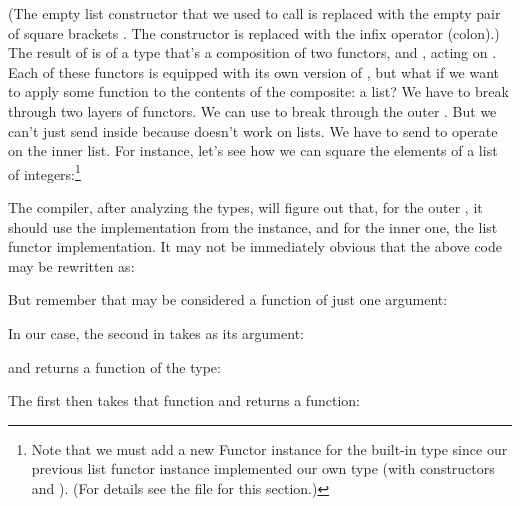 (The empty list constructor that we used to call  is
replaced with the empty pair of square brackets \code{{[}{]}}. The
 constructor is replaced with the infix operator \code{:}
(colon).) The result of  is of a type that's a
composition of two functors,  and \code{{[}{]}}, acting
on . Each of these functors is equipped with its own version
of , but what if we want to apply some function 
to the contents of the composite: a  list? We have to
break through two layers of functors. We can use  to break
through the outer . But we can't just send 
inside  because  doesn't work on lists. We have
to send  to operate on the inner list. For instance,
let's see how we can square the elements of a  list of
integers:\footnote{Note that we must add a new Functor instance
for the built-in  type since our previous list functor
instance implemented our own  type (with constructors
 and ). (For details see the 
file for this section.)}

The compiler, after analyzing the types, will figure out that, for the
outer , it should use the implementation from the
 instance, and for the inner one, the list functor
implementation. It may not be immediately obvious that the above code
may be rewritten as:

But remember that  may be considered a function of just one
argument:

In our case, the second  in  takes
as its argument:

and returns a function of the type:

The first  then takes that function and returns a function:

